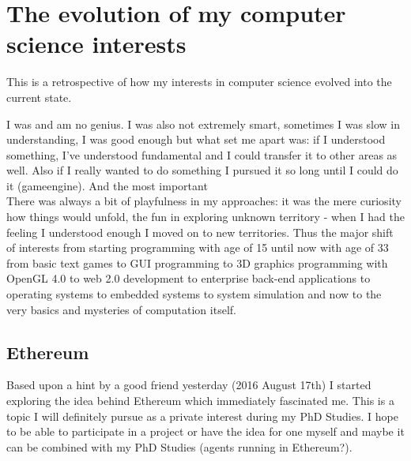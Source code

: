 \section{The evolution of my computer science interests}
\label{app:cs_interests}

This is a retrospective of how my interests in computer science evolved into the current state. \bigskip

I was and am no genius. I was also not extremely smart, sometimes I was slow in understanding, I was good enough but what set me apart was: if I understood something, I've understood fundamental and I could transfer it to other areas as well. Also if I really wanted to do something I pursued it so long until I could do it (gameengine). And the most important \\
There was always a bit of playfulness in my approaches: it was the mere curiosity how things would unfold, the fun in exploring unknown territory - when I had the feeling I understood enough I moved on to new territories. Thus the major shift of interests from starting programming with age of 15 until now with age of 33 from basic text games to GUI programming to 3D graphics programming with OpenGL 4.0 to web 2.0 development to enterprise back-end applications to operating systems to  embedded systems to system simulation and now to the very basics and mysteries of computation itself.

\bigskip



\subsection{Ethereum}
Based upon a hint by a good friend yesterday (2016 August 17th) I started exploring the idea behind Ethereum which immediately fascinated me. This is a topic I will definitely pursue as a private interest during my PhD Studies. I hope to be able to participate in a project or have the idea for one myself and maybe it can be combined with my PhD Studies (agents running in Ethereum?).
